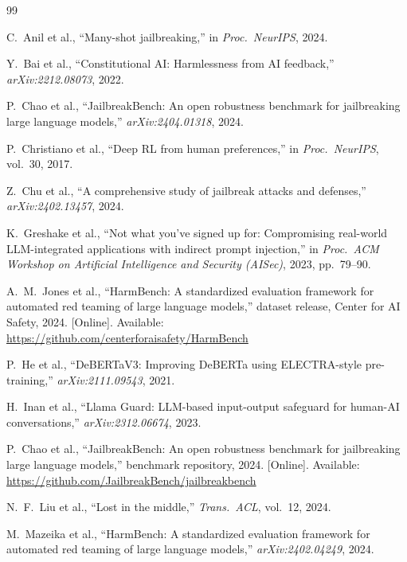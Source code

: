 \documentclass[conference]{IEEEtran}
\begin{document}
\begin{thebibliography}{99}
\small

C.\ Anil et al., ``Many-shot jailbreaking,'' in \textit{Proc.\ NeurIPS}, 2024.

Y.\ Bai et al., ``Constitutional AI: Harmlessness from AI feedback,''
\textit{arXiv:2212.08073}, 2022.

P.\ Chao et al., ``JailbreakBench: An open robustness benchmark for
jailbreaking large language models,'' \textit{arXiv:2404.01318}, 2024.

P.\ Christiano et al., ``Deep RL from human preferences,''
in \textit{Proc.\ NeurIPS}, vol.\ 30, 2017.

Z.\ Chu et al., ``A comprehensive study of jailbreak attacks and defenses,''
\textit{arXiv:2402.13457}, 2024.

K.\ Greshake et al., ``Not what you've signed up for: Compromising real-world
LLM-integrated applications with indirect prompt injection,'' in \textit{Proc.\ ACM
Workshop on Artificial Intelligence and Security (AISec)}, 2023, pp.\ 79--90.

A.\ M.\ Jones et al., ``HarmBench: A standardized evaluation framework for
automated red teaming of large language models,'' dataset release, Center for AI
Safety, 2024. [Online]. Available:
\url{https://github.com/centerforaisafety/HarmBench}

P.\ He et al., ``DeBERTaV3: Improving DeBERTa using ELECTRA-style
pre-training,'' \textit{arXiv:2111.09543}, 2021.

H.\ Inan et al., ``Llama Guard: LLM-based input-output safeguard for human-AI
conversations,'' \textit{arXiv:2312.06674}, 2023.

P.\ Chao et al., ``JailbreakBench: An open robustness benchmark for jailbreaking
large language models,'' benchmark repository, 2024. [Online]. Available:
\url{https://github.com/JailbreakBench/jailbreakbench}

N.\ F.\ Liu et al., ``Lost in the middle,'' \textit{Trans.\ ACL}, vol.\ 12, 2024.

M.\ Mazeika et al., ``HarmBench: A standardized evaluation framework for
automated red teaming of large language models,'' \textit{arXiv:2402.04249}, 2024.


\end{thebibliography}
\end{document}
